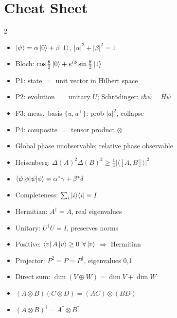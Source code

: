 \documentclass[10pt,a4paper]{article}
\begin{document}
\newpage
\section*{Cheat Sheet}

\begin{multicols}{2}

\begin{tcolorbox}[cheatstyle, title={Qubit \& Postulates}]
\begin{itemize}[nosep,leftmargin=*]
\item $\ket{\psi}=\alpha\ket{0}+\beta\ket{1}$, $|\alpha|^2+|\beta|^2=1$
\item Bloch: $\cos\frac{\theta}{2}\ket{0}+e^{i\phi}\sin\frac{\theta}{2}\ket{1}$
\item P1: state $=$ unit vector in Hilbert space
\item P2: evolution $=$ unitary $U$; Schr\"odinger: $i\hbar\dot\psi=H\psi$
\item P3: meas.\ basis $\{u,u^\perp\}$: prob $|a|^2$, collapse
\item P4: composite $=$ tensor product $\otimes$
\item Global phase unobservable; relative phase observable
\item Heisenberg: $\Delta(A)^2\Delta(B)^2\ge\frac{1}{4}|\langle[A,B]\rangle|^2$
\end{itemize}
\end{tcolorbox}

\begin{tcolorbox}[cheatstyle, title={Linear Algebra}]
\begin{itemize}[nosep,leftmargin=*]
\item $\braket{\psi|\phi}=\alpha^*\gamma+\beta^*\delta$
\item Completeness: $\sum_i\ket{i}\!\bra{i}=I$
\item Hermitian: $A^\dagger=A$, real eigenvalues
\item Unitary: $U^\dagger U=I$, preserves norms
\item Positive: $\bra{v}A\ket{v}\ge 0$ $\forall\ket{v}$ $\Rightarrow$ Hermitian
\item Projector: $P^2=P=P^\dagger$, eigenvalues 0,1
\item Direct sum: $\dim(V\oplus W)=\dim V+\dim W$
\item $(A\otimes B)(C\otimes D)=(AC)\otimes(BD)$
\item $(A\otimes B)^\dagger=A^\dagger\otimes B^\dagger$
\end{itemize}
\end{tcolorbox}


\end{multicols}
\end{document}
